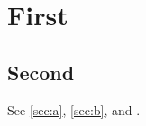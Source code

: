 \documentclass{article}
\begin{document}
\section{First}\label{sec:a}
\subsection{Second}\label{sec:b}
See \vref{sec:a}, \vref*{sec:b}, and .
\end{document}
